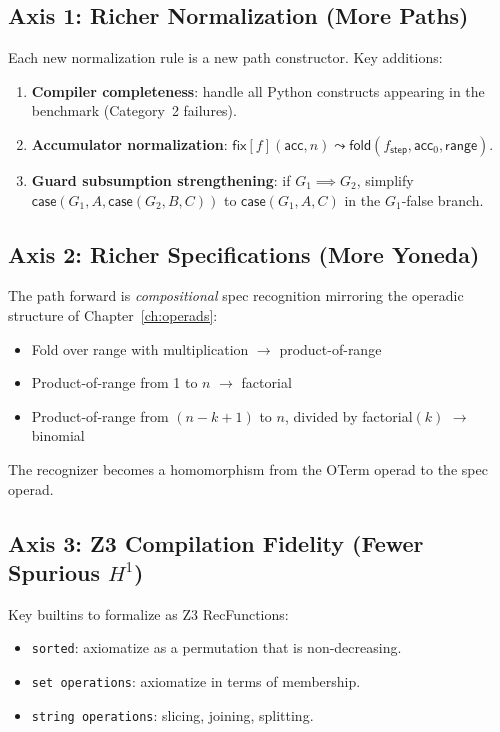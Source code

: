 \documentclass[11pt,a4paper]{report}
\theoremstyle{definition}
\theoremstyle{plain}
\newcommand{\fold}{\mathsf{fold}}
\begin{document}
\subsection{Axis 1: Richer Normalization (More Paths)}

Each new normalization rule is a new path constructor.
Key additions:
\begin{enumerate}
  \item \textbf{Compiler completeness}: handle all Python
    constructs appearing in the benchmark (Category~2 failures).
  \item \textbf{Accumulator normalization}:
    $\mathsf{fix}[f](\mathsf{acc}, n) \leadsto
    \fold(f_{\mathsf{step}}, \mathsf{acc}_0, \mathsf{range})$.
  \item \textbf{Guard subsumption strengthening}: if
    $G_1 \implies G_2$, simplify
    $\mathsf{case}(G_1, A, \mathsf{case}(G_2, B, C))$ to
    $\mathsf{case}(G_1, A, C)$ in the $G_1$-false branch.
\end{enumerate}

\subsection{Axis 2: Richer Specifications (More Yoneda)}

The path forward is \emph{compositional} spec recognition
mirroring the operadic structure of Chapter~\ref{ch:operads}:
\begin{itemize}
  \item Fold over range with multiplication $\to$
    product-of-range
  \item Product-of-range from 1 to $n$ $\to$ factorial
  \item Product-of-range from $(n-k+1)$ to $n$, divided by
    factorial$(k)$ $\to$ binomial
\end{itemize}
The recognizer becomes a homomorphism from the OTerm operad to
the spec operad.

\subsection{Axis 3: Z3 Compilation Fidelity (Fewer Spurious $H^1$)}

Key builtins to formalize as Z3 RecFunctions:
\begin{itemize}
  \item \texttt{sorted}: axiomatize as a permutation that is
    non-decreasing.
  \item \texttt{set operations}: axiomatize in terms of membership.
  \item \texttt{string operations}: slicing, joining, splitting.
\end{itemize}
\end{document}
